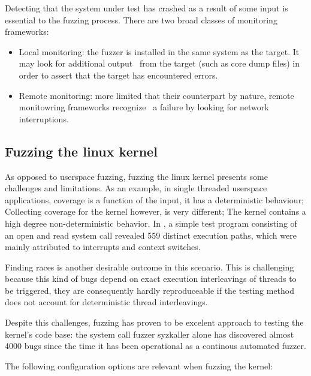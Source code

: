 Detecting that the system under test has crashed as a result of some input is essential to the fuzzing process.
There are two broad classes of monitoring frameworks\cite{mcnallyFuzzingStateArt2012}:

\begin{itemize}
    \item Local monitoring: the fuzzer is installed in the same system as the target. It may look for additional output \
    from the target (such as core dump files) in order to assert that the target has encountered errors.
    \item Remote monitoring: more limited that their counterpart by nature, remote monitowring frameworks recognize \
    a failure by looking for network interruptions.
\end{itemize}

\subsection{Fuzzing the linux kernel}

As opposed to userspace fuzzing, fuzzing the linux kernel
presents some challenges and limitations. As an example, in single threaded
userspace applications, coverage is a function of the input, it has a
deterministic behaviour; Collecting coverage for the kernel however, is
very different;  The kernel contains a high degree
non-deterministic behavior. In \cite{okechInvestigatingExecutionPath2013}, a
simple test program consisting of an open and read system call revealed
559 distinct execution paths, which were mainly attributed to interrupts and context switches.

Finding races is another desirable outcome in this scenario. This is
challenging because this kind of bugs depend on exact
execution interleavings of threads to be triggered, they are consequently hardly reproduceable if the testing method does not account for deterministic
thread interleavings.

Despite this challenges, fuzzing has proven to be excelent approach to testing the
kernel's code base: the system call fuzzer syzkaller alone has discovered
almost  4000 bugs since the time it has been operational as a continous
automated fuzzer\cite{syzbotappspot}.

The following configuration options are relevant when fuzzing the kernel:

